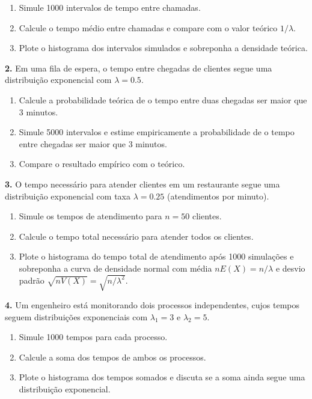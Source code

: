 \documentclass[
]{book}
\begin{document}
\begin{enumerate}
\def\labelenumi{(\alph{enumi})}
\item
  Simule 1000 intervalos de tempo entre chamadas.
\item
  Calcule o tempo médio entre chamadas e compare com o valor teórico \(1/\lambda\).
\item
  Plote o histograma dos intervalos simulados e sobreponha a densidade teórica.
\end{enumerate}

\textbf{2.} Em uma fila de espera, o tempo entre chegadas de clientes segue uma distribuição exponencial com \(\lambda = 0.5\).

\begin{enumerate}
\def\labelenumi{(\alph{enumi})}
\item
  Calcule a probabilidade teórica de o tempo entre duas chegadas ser maior que 3 minutos.
\item
  Simule 5000 intervalos e estime empiricamente a probabilidade de o tempo entre chegadas ser maior que 3 minutos.
\item
  Compare o resultado empírico com o teórico.
\end{enumerate}

\textbf{3.} O tempo necessário para atender clientes em um restaurante segue uma distribuição exponencial com taxa \(\lambda = 0.25\) (atendimentos por minuto).

\begin{enumerate}
\def\labelenumi{(\alph{enumi})}
\item
  Simule os tempos de atendimento para \(n=50\) clientes.
\item
  Calcule o tempo total necessário para atender todos os clientes.
\item
  Plote o histograma do tempo total de atendimento após 1000 simulações e sobreponha a curva de densidade normal com média \(nE(X)=n/\lambda\) e desvio padrão \(\sqrt{nV(X)} = \sqrt{n/\lambda^2}\).
\end{enumerate}

\textbf{4.} Um engenheiro está monitorando dois processos independentes, cujos tempos seguem distribuições exponenciais com \(\lambda_1 = 3\) e \(\lambda_2 = 5\).

\begin{enumerate}
\def\labelenumi{(\alph{enumi})}
\item
  Simule 1000 tempos para cada processo.
\item
  Calcule a soma dos tempos de ambos os processos.
\item
  Plote o histograma dos tempos somados e discuta se a soma ainda segue uma distribuição exponencial.
\end{enumerate}
\end{document}
